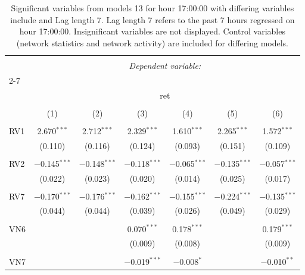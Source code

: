 
\begin{table}[!htbp] \centering 
  \caption{Significant variables from models 13 for hour 17:00:00 with differing variables include 
                               and Lag length 7. Lag length 7 refers to the past 7 hours regressed on hour 17:00:00. 
                               Insignificant variables are not displayed. 
                               Control variables (network statistics and network activity) are 
                               included for differing models.} 
  \label{RVmodels1_t_hourlagged4} 
\scriptsize 
\begin{tabular}{@{\extracolsep{5pt}}lcccccc} 
\\[-1.8ex]\hline 
\hline \\[-1.8ex] 
 & \multicolumn{6}{c}{\textit{Dependent variable:}} \\ 
\cline{2-7} 
\\[-1.8ex] & \multicolumn{6}{c}{ret} \\ 
\\[-1.8ex] & (1) & (2) & (3) & (4) & (5) & (6)\\ 
\hline \\[-1.8ex] 
 RV1 & 2.670$^{***}$ & 2.712$^{***}$ & 2.329$^{***}$ & 1.610$^{***}$ & 2.265$^{***}$ & 1.572$^{***}$ \\ 
  & (0.110) & (0.116) & (0.124) & (0.093) & (0.151) & (0.109) \\ 
  & & & & & & \\ 
 RV2 & $-$0.145$^{***}$ & $-$0.148$^{***}$ & $-$0.118$^{***}$ & $-$0.065$^{***}$ & $-$0.135$^{***}$ & $-$0.057$^{***}$ \\ 
  & (0.022) & (0.023) & (0.020) & (0.014) & (0.025) & (0.017) \\ 
  & & & & & & \\ 
 RV7 & $-$0.170$^{***}$ & $-$0.176$^{***}$ & $-$0.162$^{***}$ & $-$0.155$^{***}$ & $-$0.224$^{***}$ & $-$0.135$^{***}$ \\ 
  & (0.044) & (0.044) & (0.039) & (0.026) & (0.049) & (0.029) \\ 
  & & & & & & \\ 
 VN6 &  &  & 0.070$^{***}$ & 0.178$^{***}$ &  & 0.179$^{***}$ \\ 
  &  &  & (0.009) & (0.008) &  & (0.009) \\ 
  & & & & & & \\ 
 VN7 &  &  & $-$0.019$^{***}$ & $-$0.008$^{*}$ &  & $-$0.010$^{**}$ \\ 

\end{tabular}
\end{table}
